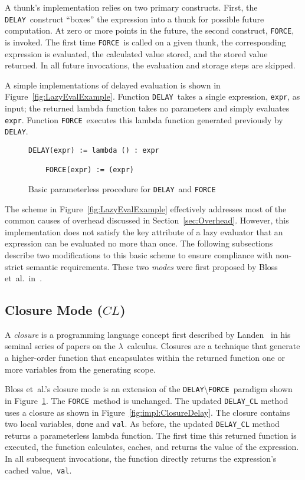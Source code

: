 \documentclass[11pt]{article}
\newcommand{\Delay}{\texttt{DELAY}}
\newcommand{\Force}{\texttt{FORCE}}
\begin{document}
A thunk's implementation relies on two primary constructs.  First, the \Delay\ construct ``boxes'' the expression into a thunk for possible future computation.  At zero or more points in the future, the second construct, \Force, is invoked.  The first time \Force\ is called on a given thunk, the corresponding expression is evaluated, the calculated value stored, and the stored value returned.  In all future invocations, the evaluation and storage steps are skipped.

A simple implementations of delayed evaluation is shown in Figure~\ref{fig:LazyEvalExample}.  Function \Delay\ takes a single expression, \texttt{expr}, as input; the returned lambda function takes no parameters and simply evaluates \texttt{expr}. Function \Force\ executes this lambda function generated previously by \Delay.

\begin{figure}[ht]
  \begin{lstlisting}[]
    DELAY(expr) := lambda () : expr

    FORCE(expr) := (expr)
  \end{lstlisting}
  \caption{Basic parameterless procedure for \Delay\ and \Force}
  \label{fig:impl:DelayForceBase}
\end{figure}

The scheme in Figure~\ref{fig:LazyEvalExample} effectively addresses most of the common causes of overhead discussed in Section~\ref{sec:Overhead}.  However, this implementation does not satisfy the key attribute of a lazy evaluator that an expression can be evaluated no more than once. The following subsections describe two modifications to this basic scheme to ensure compliance with non-strict semantic requirements.  These two \textit{modes} were first proposed by Bloss et~al.\ in~\cite{Bloss:1988}.

\subsection{Closure Mode ($CL$)}\label{sec:ClosureMode}

A \textit{closure} is a programming language concept first described by Landen~\cite{Landen:1964} in his seminal series of papers on the $\lambda$~calculus.  Closures are a technique that generate a higher-order function that encapsulates within the returned function one or more variables from the generating scope.

Bloss et~al.'s closure mode is an extension of the \Delay\textbackslash\Force\ paradigm shown in Figure~\ref{fig:impl:DelayForceBase}.  The \Force\ method is unchanged. The updated \Delay\texttt{\_CL} method uses a closure as shown in Figure~\ref{fig:impl:ClosureDelay}.  The closure contains two local variables, \texttt{done} and \texttt{val}.  As before, the updated \Delay\texttt{\_CL} method returns a parameterless lambda function. The first time this returned function is executed, the function calculates, caches, and returns the value of the expression.  In all subsequent invocations, the function directly returns the expression's cached value,~\texttt{val}.
\end{document}
